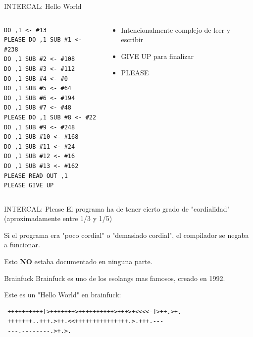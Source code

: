 \documentclass{beamer}
\begin{document}
\begin{frame}[fragile]{INTERCAL: Hello World}
\begin{columns}
\begin{column}{0.65\textwidth}
\begin{lstlisting}
DO ,1 <- #13
PLEASE DO ,1 SUB #1 <- #238
DO ,1 SUB #2 <- #108
DO ,1 SUB #3 <- #112
DO ,1 SUB #4 <- #0
DO ,1 SUB #5 <- #64
DO ,1 SUB #6 <- #194
DO ,1 SUB #7 <- #48
PLEASE DO ,1 SUB #8 <- #22
DO ,1 SUB #9 <- #248
DO ,1 SUB #10 <- #168
DO ,1 SUB #11 <- #24
DO ,1 SUB #12 <- #16
DO ,1 SUB #13 <- #162
PLEASE READ OUT ,1
PLEASE GIVE UP
    \end{lstlisting}
\end{column}
\begin{column}{0.35\textwidth}  %
\begin{itemize}
    \item Intencionalmente complejo de leer y escribir
    \item GIVE UP para finalizar
    \item PLEASE
\end{itemize}
\end{column}
\end{columns}
\end{frame}

\begin{frame}{INTERCAL: Please}
El programa ha de tener cierto grado de "cordialidad" (aproximadamente entre 1/3 y 1/5)\pause

Si el programa era "poco cordial" o "demasiado cordial", el compilador se negaba a funcionar.\pause

Esto \textbf{NO} estaba documentado en ninguna parte.
    
\end{frame}

\begin{frame}[fragile]{Brainfuck}
    Brainfuck es uno de los esolangs mas famosos, creado en 1992.\pause
    
    Este es un "Hello World" en brainfuck:
    \begin{lstlisting}
 ++++++++++[>+++++++>++++++++++>+++>+<<<<-]>++.>+.
 +++++++..+++.>++.<<+++++++++++++++.>.+++.---
 ---.--------.>+.>.
\end{lstlisting}

\end{frame}
\end{document}
